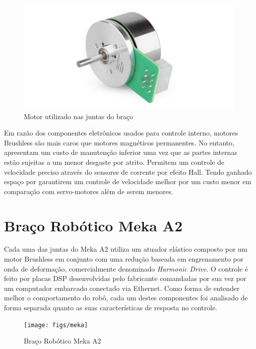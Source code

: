 \begin{figure}[H]
    \centering
    \includegraphics[width = 0.6\linewidth]{figs/maxon_flat_servo.jpg}
    \caption{Motor utilizado nas juntas do braço}
    \label{fig:maxon-flat-servo}
\end{figure}

Em razão dos componentes eletrônicos usados para controle interno, motores Brushless são mais caros que motores magnéticos permanentes. No entanto, apresentam um custo de manutenção inferior uma vez que as partes internas estão sujeitas a um menor desgaste por atrito. Permitem um controle de velocidade preciso através do sensores de corrente por efeito Hall. Tendo ganhado espaço por garantirem um controle de velocidade melhor por um custo menor em comparação com servo-motores além de serem menores.


\section{Braço Robótico Meka A2}

Cada uma das juntas do Meka A2 utiliza um atuador elástico composto por um motor Brushless em conjunto com uma redução baseada em engrenamento por onda de deformação, comercialmente denominado \textit{Harmonic Drive}. O controle é feito por placas DSP desenvolvidas pelo fabricante comandadas por sua vez por um computador embarcado conectado via Ethernet. Como forma de entender melhor o comportamento do robô, cada um destes componentes foi analisado de forma separada quanto as suas características de resposta no controle. 

\begin{figure}[H]
    \centering
    \texttt{[image: figs/meka]}
    \caption{Braço Robótico Meka A2}
    \label{fig:meka_arm}
\end{figure}

